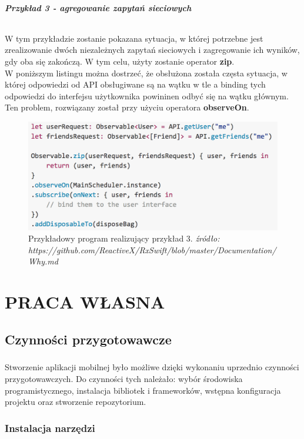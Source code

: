 \documentclass[12pt,oneside,a4paper]{report}
\begin{document}
\paragraph{Przykład 3 - agregowanie zapytań sieciowych}
\subparagraph{}W tym przykładzie zostanie pokazana sytuacja, w której potrzebne jest zrealizowanie dwóch niezależnych zapytań sieciowych i zagregowanie ich wyników, gdy oba się zakończą. W tym celu, użyty zostanie operator \textbf{zip}.\\
W poniższym listingu można dostrzeć, że obsłużona została częsta sytuacja, w której odpowiedzi od API obsługiwane są na wątku w tle a binding tych odpowiedzi do interfejsu użytkownika powininen odbyć się na wątku głównym. Ten problem, rozwiązany został przy użyciu operatora \textbf{observeOn}.
\begin{figure}[ht!]
	\centering
	\includegraphics[width=14cm]{aggregatingNetworkRequests}
	\caption{Przykładowy program realizujący przykład 3. 
		\textit{źródło: https://github.com/ReactiveX/RxSwift/blob/master/Documentation/Why.md}}
	\label{aggregatingNetworkRequests}
\end{figure}

\chapter{PRACA WŁASNA}
\section{Czynności przygotowawcze}		
\paragraph{}Stworzenie aplikacji mobilnej było możliwe dzięki wykonaniu uprzednio czynności przygotowawczych. Do czynności tych należało: wybór środowiska programistycznego, instalacja bibliotek i frameworków, wstępna konfiguracja projektu oraz stworzenie repozytorium.
\subsection{Instalacja narzędzi}
\end{document}
